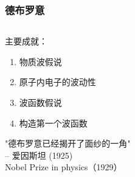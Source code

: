 \begin{frame}
    \frametitle{德布罗意}
        \begin{columns}
            \begin{column}[t]{0.46\linewidth}
                主要成就：
                \begin{enumerate}
                    \item 物质波假说
                    \item 原子内电子的波动性
                    \item 波函数假说 
                    \item 构造第一个波函数
                \end{enumerate}
                "德布罗意已经揭开了面纱的一角"  \\
                \qquad \qquad-- 爱因斯坦 (1925) \\
                {\color{deepred} Nobel Prize in physics（1929）}
            \end{column}
            \begin{column}[t]{0.46\linewidth}
                \begin{center}

\end{center}
\end{column}
\end{columns}
\end{frame}
